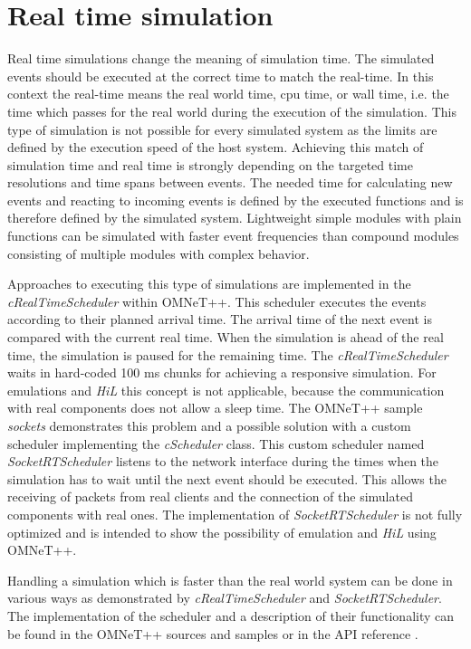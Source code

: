 \section{Real time simulation}
\label{sec:simulation_real_time}
Real time simulations change the meaning of simulation time.
The simulated events should be executed at the correct time to match the real-time.
In this context the real-time means the real world time, cpu time, or wall time, i.e. the time which passes for the real world during the execution of the simulation.
This type of simulation is not possible for every simulated system as the limits are defined by the execution speed of the host system.
Achieving this match of simulation time and real time is strongly depending on the targeted time resolutions and time spans between events.
The needed time for calculating new events and reacting to incoming events is defined by the executed functions and is therefore defined by the simulated system.
Lightweight simple modules with plain functions can be simulated with faster event frequencies than compound modules consisting of multiple modules with complex behavior.

Approaches to executing this type of simulations are implemented in the \emph{cRealTimeScheduler} within OMNeT++.
This scheduler executes the events according to their planned arrival time.
The arrival time of the next event is compared with the current real time.
When the simulation is ahead of the real time, the simulation is paused for the remaining time.
The \emph{cRealTimeScheduler} waits in hard-coded 100 ms chunks for achieving a responsive simulation.
For emulations and \emph{HiL} this concept is not applicable, because the communication with real components does not allow a sleep time.
The OMNeT++ sample \emph{sockets} demonstrates this problem and a possible solution with a custom scheduler implementing the \emph{cScheduler} class.
This custom scheduler named \emph{SocketRTScheduler} listens to the network interface during the times when the simulation has to wait until the next event should be executed.
This allows the receiving of packets from real clients and the connection of the simulated components with real ones.
The implementation of \emph{SocketRTScheduler} is not fully optimized and is intended to show the possibility of emulation and \emph{HiL} using OMNeT++.

Handling a simulation which is faster than the real world system can be done in various ways as demonstrated by \emph{cRealTimeScheduler} and \emph{SocketRTScheduler}.
The implementation of the scheduler and a description of their functionality can be found in the OMNeT++ sources and samples or in the API reference \cite{omnet_api}.

